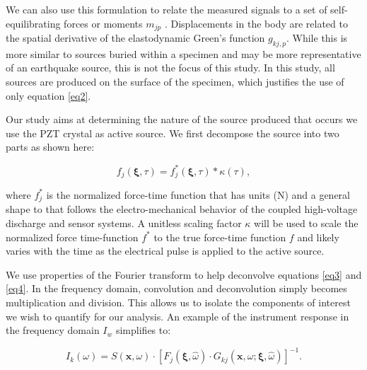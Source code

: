 \documentclass[preprint,3p, 11pt,authoryear]{elsarticle}
\begin{document}
\noindent We can also use this formulation to relate the measured signals to a set of self-equilibrating forces or moments $m_{jp}$ \citep{Aki2002}. Displacements in the body are related to the spatial derivative of the elastodynamic Green's function $g_{kj,p}$.  While this is more similar to sources buried within a specimen and may be more representative of an earthquake source, this is not the focus of this study.  In this study, all sources are produced on the surface of the specimen, which justifies the use of only equation \eqref{eq2}.

Our study aims at determining the nature of the source produced that occurs we use the PZT crystal as active source. We first decompose the source into two parts as shown here:

\begin{equation}
    \label{eq4}
    f_{j}\left( \mathbf{\xi}, \tau \right) = f^{*}_{j}\left( \mathbf{\xi}, \tau \right)  \ast \kappa \left( \tau \right),
\end{equation}

\noindent where $f^{*}_{j}$ is the normalized force-time function that has units (N) and a general shape to that follows the electro-mechanical behavior of the coupled high-voltage discharge and sensor systems.  A unitless scaling factor $\kappa$ will be used to scale the normalized force time-function $f^{*}$ to the true force-time function $f$ and likely varies with the time as the electrical pulse is applied to the active source.

We use properties of the Fourier transform \citep{Bracewell1986} to help deconvolve equations \eqref{eq3} and \eqref{eq4}.  In the frequency domain, convolution and deconvolution simply becomes multiplication and division. This allows us to isolate the components of interest we wish to quantify for our analysis. An example of the instrument response in the frequency domain $I_{w}$ simplifies to:

\begin{equation}
    \label{eq5}
        I_{k}\left(\omega \right) = 
        S\left( \mathbf{x}, \omega \right) \cdot \left[ F_{j}\left( \mathbf{\xi}, \hat{\omega} \right) \cdot G_{kj}\left( \mathbf{x}, \omega; \mathbf{\xi}, \hat{\omega} \right)\right]^{-1} .
\end{equation}
\end{document}
